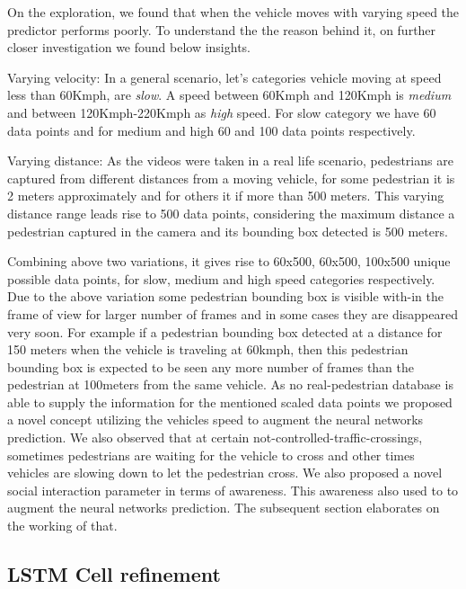 On the exploration, we found that when the vehicle moves with varying speed the predictor performs poorly. To understand the the reason behind it, on further closer investigation we found below insights. 

Varying velocity: In a general scenario, let's categories vehicle moving at speed less than 60Kmph, are \textit{slow}. A speed between 60Kmph and 120Kmph is \textit{medium} and between 120Kmph-220Kmph as \textit{high} speed. For slow category we have 60 data points and for medium and high 60 and 100 data points respectively.

Varying distance: As the videos were taken in a real life scenario, pedestrians are captured from different distances from a moving vehicle, for some pedestrian it is 2 meters approximately and for others it if more than 500 meters. This varying distance range leads rise to 500 data points, considering the maximum distance a pedestrian captured in the camera and its bounding box detected is 500 meters.

Combining above two variations, it gives rise to 60x500, 60x500, 100x500 unique possible data points, for slow, medium and high speed categories respectively. Due to the above variation some pedestrian bounding box is visible with-in the frame of view for larger number of frames and in some cases they are disappeared very soon. For example if a pedestrian bounding box detected at a distance for 150 meters when the vehicle is traveling at 60kmph, then this pedestrian bounding box is expected to be seen any more number of frames than the pedestrian at 100meters from the same vehicle.
As no real-pedestrian database is able to supply the information for the mentioned scaled data points we proposed a novel concept utilizing the vehicles speed to augment the neural networks prediction.
We also observed that at certain not-controlled-traffic-crossings, sometimes pedestrians are waiting for the vehicle to cross and other times vehicles are slowing down to  let the pedestrian cross. We also proposed a novel social interaction parameter in terms of awareness. This awareness also used to  to augment the neural networks prediction. The subsequent section elaborates on the working of that.

\subsection{LSTM Cell refinement} \label{state_refinement}

